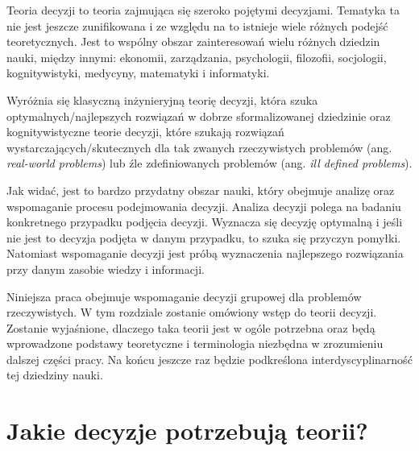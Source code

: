 Teoria decyzji to teoria zajmująca się szeroko pojętymi decyzjami. 
Tematyka ta nie jest jeszcze zunifikowana i ze względu na 
to istnieje wiele różnych podejść teoretycznych. 
Jest to wspólny obszar zainteresowań wielu różnych dziedzin nauki, między 
innymi: ekonomii, zarządzania, psychologii, filozofii, 
socjologii, kognitywistyki, medycyny, matematyki i informatyki.

Wyróżnia się klasyczną inżynieryjną teorię decyzji, która szuka
optymalnych/najlepszych rozwiązań w dobrze sformalizowanej dziedzinie 
oraz kognitywistyczne teorie decyzji, które szukają rozwiązań
wystarczających/skutecznych dla tak zwanych rzeczywistych problemów (ang.
\textit{real-world problems}) lub źle zdefiniowanych problemów (ang. \textit{ill
defined problems}).

Jak widać, jest to bardzo przydatny obszar nauki, który obejmuje analizę oraz
wspomaganie procesu podejmowania decyzji. Analiza decyzji polega na badaniu
konkretnego przypadku podjęcia decyzji. Wyznacza się decyzję optymalną i jeśli
nie jest to decyzja podjęta w danym przypadku, to szuka się przyczyn pomyłki.
Natomiast wspomaganie decyzji jest próbą wyznaczenia najlepszego rozwiązania
przy danym zasobie wiedzy i informacji.

Niniejsza praca obejmuje wspomaganie decyzji grupowej dla problemów
rzeczywistych. W tym rozdziale zostanie omówiony wstęp do teorii decyzji.
Zostanie wyjaśnione, dlaczego taka teorii jest w ogóle potrzebna oraz
będą wprowadzone podstawy teoretyczne i terminologia niezbędna w zrozumieniu
dalszej części pracy. Na końcu jeszcze raz będzie podkreślona
interdyscyplinarność tej dziedziny nauki.

\section{Jakie decyzje potrzebują teorii?}

